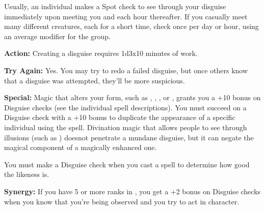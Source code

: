 Usually, an individual makes a Spot check to see through your disguise immediately upon meeting you and each hour thereafter. If you casually meet many different creatures, each for a short time, check once per day or hour, using an average  modifier for the group. 

\textbf{Action:} Creating a disguise requires 1d3x10 minutes of work.

\textbf{Try Again:} Yes. You may try to redo a failed disguise, but once others know that a disguise was attempted, they'll be more suspicious.

\textbf{Special:} Magic that alters your form, such as , , , or , grants you a +10 bonus on Disguise checks (see the individual spell descriptions). You must succeed on a Disguise check with a +10 bonus to duplicate the appearance of a specific individual using the  spell. Divination magic that allows people to see through illusions (such as ) doesnot penetrate a mundane disguise, but it can negate the magical component of a magically enhanced one.

You must make a Disguise check when you cast a  spell to determine how good the likeness is.

\textbf{Synergy:} If you have 5 or more ranks in , you get a +2 bonus on Disguise checks when you know that you're being observed and you try to act in character.
